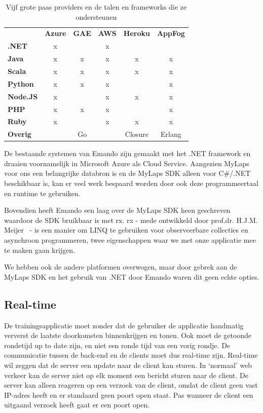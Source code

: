 \begin{table}
\caption {Vijf grote \ac{paas} providers en de talen en frameworks die ze ondersteunen} \label{tab:paas} 
\begin{tabular}{lccccc}
\textbf{}        & \multicolumn{1}{l}{\textbf{Azure}} & \multicolumn{1}{l}{\textbf{GAE}} & \multicolumn{1}{l}{\textbf{AWS}} & \multicolumn{1}{l}{\textbf{Heroku}} & \multicolumn{1}{l}{\textbf{AppFog}} \\
\textbf{.NET}    & x &   & x &   &   \\
\textbf{Java}    & x & x & x & x & x \\
\textbf{Scala}   & x & x & x & x & x \\
\textbf{Python}  & x & x & x &   & x \\
\textbf{Node.JS} & x &   & x & x & x \\
\textbf{PHP}     & x & x & x &   & x \\
\textbf{Ruby}    & x &   & x & x & x \\
\textbf{Overig}  &   & Go & & Closure & Erlang
\end{tabular}
\end{table}

De bestaande systemen van Emando zijn gemaakt met het .NET framework en draaien voornamelijk in Microsoft Azure als Cloud Service. Aangezien MyLaps voor ons een belangrijke databron is en de MyLaps SDK alleen voor C\#/.NET beschikbaar is, kan er veel werk bespaard worden door ook deze programmeertaal en runtime te gebruiken. 

Bovendien heeft Emando een laag over de MyLaps SDK heen geschreven waardoor de SDK bruikbaar is met \acf{rx}. \ac{rx} - mede ontwikkeld door prof.dr. H.J.M. Meijer~\cite{meijer2011world} - is een manier om LINQ te gebruiken voor observeerbare collecties en asynchroon programmeren, twee eigenschappen waar we met onze applicatie mee te maken gaan krijgen.

We hebben ook de andere platformen overwogen, maar door gebrek aan de MyLaps SDK en het gebruik van .NET door Emando waren dit geen echte opties.

\subsection{Real-time}\label{sec:orientatie-real-time}
De trainingsapplicatie moet zonder dat de gebruiker de applicatie handmatig ververst de laatste doorkomsten binnenkrijgen en tonen. Ook moet de getoonde rondetijd up to date zijn, en niet een ronde tijd van een vorig rondje. De communicatie tussen de back-end en de clients moet dus real-time zijn. Real-time wil zeggen dat de server een update naar de client kan sturen. In `normaal' web verkeer kan de server niet op elk moment een bericht sturen naar de client. De server kan alleen reageren op een verzoek van de client, omdat de client geen vast IP-adres heeft en er standaard geen poort open staat. Pas wanneer de client een uitgaand verzoek heeft gaat er een poort open.

